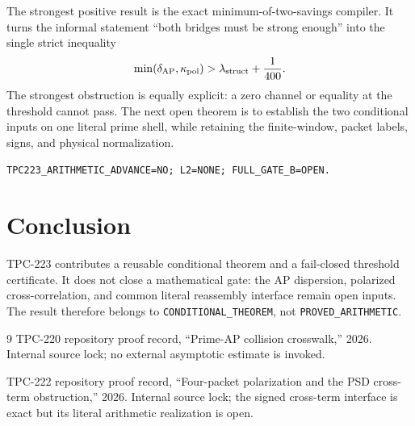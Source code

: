 \documentclass[11pt]{article}
\begin{document}
The strongest positive result is the exact minimum-of-two-savings compiler.  It
turns the informal statement ``both bridges must be strong enough'' into the
single strict inequality
\[
 \min(\delta_{\rm AP},\kappa_{\rm pol})
   >\lambda_{\rm struct}+\frac1{400}.
\]
The strongest obstruction is equally explicit: a zero channel or equality at
the threshold cannot pass.  The next open theorem is to establish the two
conditional inputs on one literal prime shell, while retaining the finite-window,
packet labels, signs, and physical normalization.

\begin{center}
\texttt{TPC223\_ARITHMETIC\_ADVANCE=NO; L2=NONE; FULL\_GATE\_B=OPEN.}
\end{center}

\section{Conclusion}

TPC-223 contributes a reusable conditional theorem and a fail-closed threshold
certificate.  It does not close a mathematical gate: the AP dispersion,
polarized cross-correlation, and common literal reassembly interface remain
open inputs.  The result therefore belongs to
\texttt{CONDITIONAL\_THEOREM}, not \texttt{PROVED\_ARITHMETIC}.

\begin{thebibliography}{9}
TPC-220 repository proof record, ``Prime-AP collision crosswalk,'' 2026.
Internal source lock; no external asymptotic estimate is invoked.

TPC-222 repository proof record, ``Four-packet polarization and the PSD
cross-term obstruction,'' 2026.  Internal source lock; the signed cross-term
interface is exact but its literal arithmetic realization is open.
\end{thebibliography}
\end{document}
